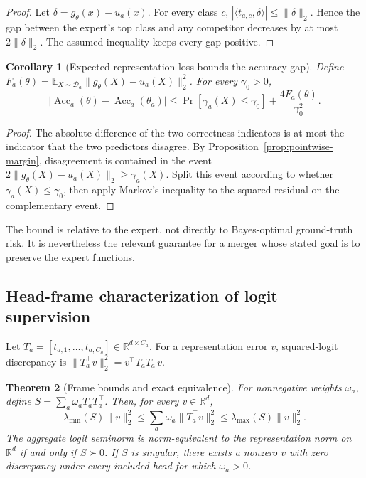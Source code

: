 \documentclass[letterpaper]{article} %
\theoremstyle{plain}
\newtheorem{theorem}{Theorem}
\newtheorem{corollary}[theorem]{Corollary}
\theoremstyle{definition}
\begin{document}
\begin{proof}
Let $\delta=g_\theta(x)-u_a(x)$.
For every class $c$, $|\langle t_{a,c},\delta\rangle|\le\|\delta\|_2$.
Hence the gap between the expert's top class and any competitor decreases by at most $2\|\delta\|_2$.
The assumed inequality keeps every gap positive.
\end{proof}

\begin{corollary}[Expected representation loss bounds the accuracy gap]
\label{cor:accuracy-gap}
Define $F_a(\theta)=\mathbb E_{X\sim\mathcal D_a} \|g_\theta(X)-u_a(X)\|_2^2$.
For every $\gamma_0>0$,
\begin{equation}
\left|\operatorname{Acc}_a(\theta)-\operatorname{Acc}_a(\theta_a)\right|
\le
\Pr[\gamma_a(X)\le\gamma_0]
+\frac{4F_a(\theta)}{\gamma_0^2}.
\label{eq:accuracy-gap}
\end{equation}
\end{corollary}

\begin{proof}
The absolute difference of the two correctness indicators is at most the indicator that the two predictors disagree.
By Proposition~\ref{prop:pointwise-margin}, disagreement is contained in the event $2\|g_\theta(X)-u_a(X)\|_2\ge\gamma_a(X)$.
Split this event according to whether $\gamma_a(X)\le\gamma_0$, then apply Markov's inequality to the squared residual on the complementary event.
\end{proof}

The bound is relative to the expert, not directly to Bayes-optimal ground-truth risk.
It is nevertheless the relevant guarantee for a merger whose stated goal is to preserve the expert functions.

\subsection{Head-frame characterization of logit supervision}
\label{app:head-frame}

Let $T_a=[t_{a,1},\ldots,t_{a,C_a}]\in\mathbb R^{d\times C_a}$.
For a representation error $v$, squared-logit discrepancy is $\|T_a^\top v\|_2^2=v^\top T_aT_a^\top v$.

\begin{theorem}[Frame bounds and exact equivalence]
\label{thm:frame}
For nonnegative weights $\omega_a$, define $S=\sum_a\omega_aT_aT_a^\top$.
Then, for every $v\in\mathbb R^d$,
\begin{equation}
\lambda_{\min}(S)\|v\|_2^2
\le\sum_a\omega_a\|T_a^\top v\|_2^2
\le\lambda_{\max}(S)\|v\|_2^2.
\label{eq:frame-bounds}
\end{equation}
The aggregate logit seminorm is norm-equivalent to the representation norm on $\mathbb R^d$ if and only if $S\succ0$.
If $S$ is singular, there exists a nonzero $v$ with zero discrepancy under every included head for which $\omega_a>0$.
\end{theorem}
\end{document}
